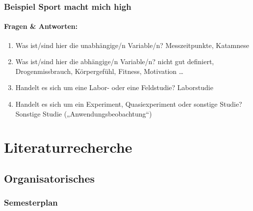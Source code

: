 \documentclass[
]{book}
\providecommand{\tightlist}{%
  \setlength{\itemsep}{0pt}\setlength{\parskip}{0pt}}
\begin{document}
\hypertarget{beispiel-sport-macht-mich-high}{%
\subsection{Beispiel Sport macht mich high}\label{beispiel-sport-macht-mich-high}}

\hypertarget{fragen-antworten-3}{%
\subsubsection{Fragen \& Antworten:}\label{fragen-antworten-3}}

\begin{enumerate}
\def\labelenumi{\arabic{enumi}.}
\tightlist
\item
  Was ist/sind hier die unabhängige/n Variable/n? \smallskip \newline Messzeitpunkte, Katamnese \smallskip \newline
\item
  Was ist/sind hier die abhängige/n Variable/n? \smallskip \newline nicht gut definiert, Drogenmissbrauch, Körpergefühl, Fitness, Motivation \ldots{} \smallskip \newline
\item
  Handelt es sich um eine Labor- oder eine Feldstudie? \smallskip \newline Laborstudie \smallskip \newline
\item
  Handelt es sich um ein Experiment, Quasiexperiment oder sonstige Studie? \smallskip \newline Sonstige Studie („Anwendungsbeobachtung``)
\end{enumerate}

\hypertarget{literaturrecherche}{%
\chapter{Literaturrecherche}\label{literaturrecherche}}

\hypertarget{organisatorisches-3}{%
\section{Organisatorisches}\label{organisatorisches-3}}

\hypertarget{semesterplan-4}{%
\subsection{Semesterplan}\label{semesterplan-4}}
\end{document}
